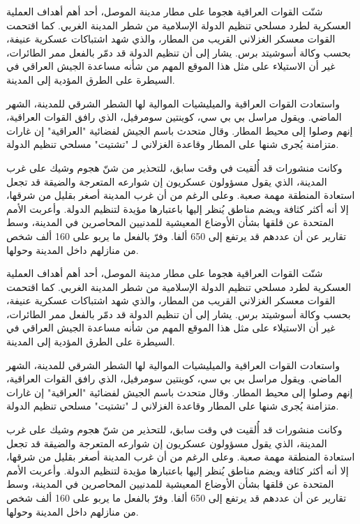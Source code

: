 \documentclass[a5paper]{article}
\begin{document}
\begin{multicols}{3}
\setlength\parskip{0pt}
	شنّت القوات العراقية هجوما على مطار مدينة الموصل، أحد أهم أهداف العملية العسكرية لطرد مسلحي تنظيم الدولة الإسلامية من شطر المدينة الغربي.  كما اقتحمت القوات معسكر الغزلاني القريب من المطار، والذي شهد اشتباكات عسكرية عنيفة، بحسب وكالة أسوشيتد برس.  يشار إلى أن تنظيم الدولة قد دمّر بالفعل ممر الطائرات، غير أن الاستيلاء على مثل هذا الموقع المهم من شأنه مساعدة الجيش العراقي في السيطرة على الطرق المؤدية إلى المدينة.

واستعادت القوات العراقية والميليشيات الموالية لها الشطر الشرقي للمدينة، الشهر الماضي.  ويقول مراسل بي بي سي، كوينتين سومرفيل، الذي رافق القوات العراقية، إنهم وصلوا إلى محيط المطار.  وقال متحدث باسم الجيش لفضائية "العراقية" إن غارات متزامنة يُجرى شنها على المطار وقاعدة الغزلاني لـ "تشتيت" مسلحي تنظيم الدولة.

وكانت منشورات قد أُلقيت في وقت سابق، للتحذير من شنّ هجوم وشيك على غرب المدينة، الذي يقول مسؤولون عسكريون إن شوارعه المتعرجة والضيقة قد تجعل استعادة المنطقة مهمة صعبة. وعلى الرغم من أن غرب المدينة أصغر بقليل من شرقها، إلا أنه أكثر كثافة ويضم مناطق يُنظر إليها باعتبارها مؤيدة لتنظيم الدولة.  وأعربت الأمم المتحدة عن قلقها بشأن الأوضاع المعيشية للمدنيين المحاصرين في المدينة، وسط تقارير عن أن عددهم قد يرتفع إلى 650 ألفا.  وفرّ بالفعل ما يربو على 160 ألف شخص من منازلهم داخل المدينة وحولها.  

\end{multicols}

\vfill

\begin{multicols}{4}
	شنّت القوات العراقية هجوما على مطار مدينة الموصل، أحد أهم أهداف العملية العسكرية لطرد مسلحي تنظيم الدولة الإسلامية من شطر المدينة الغربي.  كما اقتحمت القوات معسكر الغزلاني القريب من المطار، والذي شهد اشتباكات عسكرية عنيفة، بحسب وكالة أسوشيتد برس.  يشار إلى أن تنظيم الدولة قد دمّر بالفعل ممر الطائرات، غير أن الاستيلاء على مثل هذا الموقع المهم من شأنه مساعدة الجيش العراقي في السيطرة على الطرق المؤدية إلى المدينة.

واستعادت القوات العراقية والميليشيات الموالية لها الشطر الشرقي للمدينة، الشهر الماضي.  ويقول مراسل بي بي سي، كوينتين سومرفيل، الذي رافق القوات العراقية، إنهم وصلوا إلى محيط المطار.  وقال متحدث باسم الجيش لفضائية "العراقية" إن غارات متزامنة يُجرى شنها على المطار وقاعدة الغزلاني لـ "تشتيت" مسلحي تنظيم الدولة.  

وكانت منشورات قد أُلقيت في وقت سابق، للتحذير من شنّ هجوم وشيك على غرب المدينة، الذي يقول مسؤولون عسكريون إن شوارعه المتعرجة والضيقة قد تجعل استعادة المنطقة مهمة صعبة. وعلى الرغم من أن غرب المدينة أصغر بقليل من شرقها، إلا أنه أكثر كثافة ويضم مناطق يُنظر إليها باعتبارها مؤيدة لتنظيم الدولة.  وأعربت الأمم المتحدة عن قلقها بشأن الأوضاع المعيشية للمدنيين المحاصرين في المدينة، وسط تقارير عن أن عددهم قد يرتفع إلى 650 ألفا.  وفرّ بالفعل ما يربو على 160 ألف شخص من منازلهم داخل المدينة وحولها.  

\end{multicols}
\end{document}
